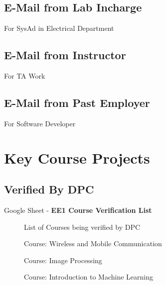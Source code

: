 \documentclass{article}
\begin{document}
	\subsection{E-Mail from Lab Incharge}
		For SysAd in Electrical Department
		\begin{figure}[h]
		\end{figure}
\newpage
	\subsection{E-Mail from Instructor}
		For TA Work
		\begin{figure}[h]
		\end{figure}
\newpage
	\subsection{E-Mail from Past Employer}
		For Software Developer
		\begin{figure}[h]
		\end{figure}
\newpage
\section{Key Course Projects}
	\subsection{Verified By DPC}
		Google Sheet - \textbf{EE1 Course Verification List}
		\begin{figure}[h]
			\caption{List of Courses being verified by DPC}
		\end{figure}
\newpage
		\begin{figure}[h]
			\caption{Course: Wireless and Mobile Communication}
		\end{figure}
		\begin{figure}[h]
			\caption{Course: Image Processing}
		\end{figure}
\newpage
		\begin{figure}[h]
			\caption{Course: Introduction to Machine Learning}
		\end{figure}
\newpage
\end{document}
